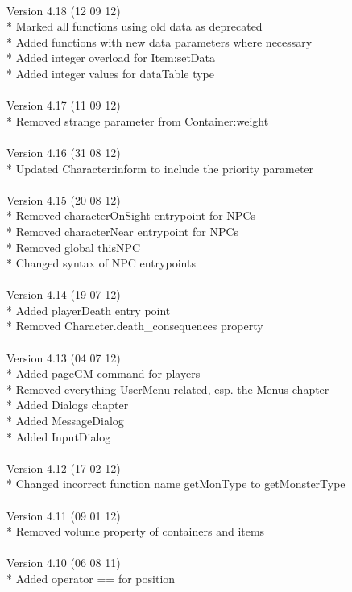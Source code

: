 \documentclass[a4paper,10pt,makeidx]{scrreprt}
\begin{document}
\\
Version 4.18 (12 09 12)\\
* Marked all functions using old data as deprecated\\
* Added functions with new data parameters where necessary\\
* Added integer overload for Item:setData\\
* Added integer values for dataTable type\\
\\
Version 4.17 (11 09 12)\\
* Removed strange parameter from Container:weight\\
\\
Version 4.16 (31 08 12)\\
* Updated Character:inform to include the priority parameter\\
\\
Version 4.15 (20 08 12)\\
* Removed characterOnSight entrypoint for NPCs\\
* Removed characterNear entrypoint for NPCs\\
* Removed global thisNPC\\
* Changed syntax of NPC entrypoints\\
\\
Version 4.14 (19 07 12)\\
* Added playerDeath entry point\\
* Removed Character.death\_consequences property\\ 
\\
Version 4.13 (04 07 12)\\
* Added pageGM command for players\\
* Removed everything UserMenu related, esp. the Menus chapter\\
* Added Dialogs chapter\\
* Added MessageDialog\\
* Added InputDialog\\
\\
Version 4.12 (17 02 12)\\
* Changed incorrect function name getMonType to getMonsterType\\
\\
Version 4.11 (09 01 12)\\
* Removed volume property of containers and items\\
\\
Version 4.10 (06 08 11)\\
* Added operator == for position\\
\end{document}
